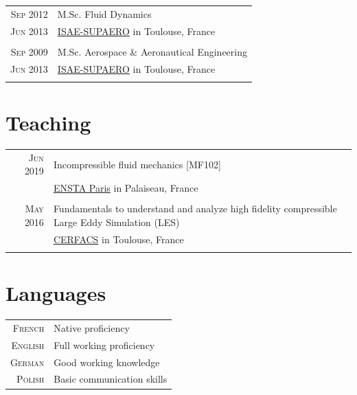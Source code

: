 \documentclass[a4paper,10pt]{article}
\begin{document}
\begin{tabular}{r|p{15cm}}
                \textsc{Sep 2012} & M.Sc. Fluid Dynamics                                          \\
    \textsc{Jun 2013}   &  \href{https://www.isae-supaero.fr/en/}{ISAE-SUPAERO} in Toulouse, France \\
            \multicolumn{2}{c}{}                                                                                                                                                                                           \\
                \textsc{Sep 2009} & M.Sc. Aerospace \& Aeronautical Engineering                                          \\
    \textsc{Jun 2013}   &  \href{https://www.isae-supaero.fr/en/}{ISAE-SUPAERO} in Toulouse, France \\
            \multicolumn{2}{c}{}                                                                                                                                                                                           \\
                \end{tabular}

\section{Teaching}
\begin{tabular}{r|p{15cm}}
        \textsc{Jun 2019} & Incompressible fluid mechanics [MF102]                                                     \\
                                     & \href{https://www.ensta-paris.fr/}{ENSTA Paris} in Palaiseau, France \\
    \multicolumn{2}{c}{}                                                                                       \\
        \textsc{May 2016} & Fundamentals to understand and analyze high fidelity compressible Large Eddy Simulation (LES)                                                     \\
                                     & \href{https://cerfacs.fr}{CERFACS} in Toulouse, France \\
    \multicolumn{2}{c}{}                                                                                       \\
    \end{tabular}

\section{Languages}
\begin{tabular}{rl}
        \textsc{French} & Native proficiency \\
        \textsc{English} & Full working proficiency \\
        \textsc{German} & Good working knowledge \\
        \textsc{Polish} & Basic communication skills \\
    \end{tabular}
\end{document}
